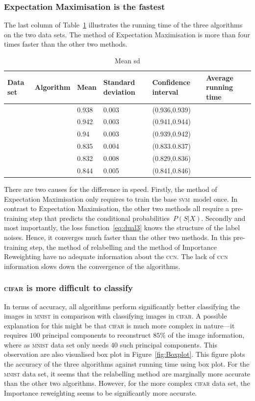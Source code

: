 \documentclass[12pt]{article} %
\newcommand{\svm}{\textsc{svm}}
\begin{document}
\subsubsection{Expectation Maximisation is the fastest}
The last column of Table~\ref{tab:Meansd} illustrates the running time of the three algorithms on the two data sets.
The method of Expectation Maximisation is more than four times faster than the other two methods.
\begin{table}
	\caption{Mean sd}
	\label{tab:Meansd}
\centering
\begin{tabular}{@{}llllll@{}}
\toprule
Data set& Algorithm&Mean  & Standard deviation & Confidence interval & Average running time \\ \midrule
&&0.938 & 0.003              & (0.936,0.939)     &  \\
&&0.942 & 0.003              & (0.941,0.944)     &  \\
&&0.94  & 0.003              & (0.939,0.942)     &  \\
&&0.835 & 0.004              & (0.833.0.837)     &  \\
&&0.832 & 0.008              & (0.829,0.836)     &  \\
&&0.844 & 0.005              & (0.841,0.846)     &  \\ \bottomrule
\end{tabular}
\end{table}
There are two  causes for the difference in speed.
Firstly, the method of Expectation Maximisation only requires to train the base \svm\ model once.
In contrast to Expectation Maximisation, the other two methods all require a pre-training step that predicts the conditional probabilities~$P(S|X)$.
Secondly and most importantly, the loss function~\eqref{eq:dual3} knows the structure of the label noises. Hence, it converges much faster than the other two methods.
In this pre-training step, the method of relabelling and the method of Importance Reweighting have no adequate information about the \textsc{ccn}.
The lack of \textsc{ccn} information slows down the convergence of the algorithms.

\subsubsection{\textsc{cifar} is more difficult to classify}
In terms of accuracy, all algorithms perform significantly better classifying the images in \textsc{mnist} in comparison with classifying images in \textsc{cifar}.
A possible explanation for this might be that \textsc{cifar} is much more complex in nature---it requires $100$ principal components to reconstruct $85\%$ of the image information, where as \textsc{mnist} data set only needs $40$ such principal components.
This observation are also visualised box plot in Figure~\ref{fig:Boxplot}. This figure plots the accuracy of the three algorithms against running time using box plot. For the \textsc{mnist}  data set, it seems that the relabelling method are marginally more accurate than the other two algorithms. However, for the  more complex \textsc{cifar} data set, the Importance reweighting seems to be significantly more accurate.
\end{document}
